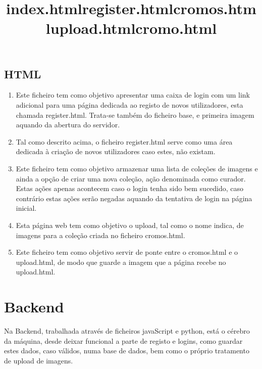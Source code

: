 \documentclass{report}
\begin{document}
\section{HTML}
\renewcommand{\theenumi}{\arabic{enumi}} 
\begin{enumerate} 

\item\title{\textbf{index.html}} 

Este ficheiro tem como objetivo apresentar uma caixa de login com  um link adicional para uma página dedicada ao registo de novos utilizadores, esta chamada register.html. Trata-se também do ficheiro base, e primeira imagem aquando da abertura do servidor.

\item\title{\textbf{register.html}} 

Tal como descrito acima, o ficheiro register.html serve como uma área dedicada à criação de novos utilizadores caso estes, não existam.

\item\title{\textbf{cromos.html}} 

Este ficheiro tem como objetivo armazenar uma lista de coleções de imagens e ainda a opção de criar uma nova coleção, ação denominada como curador. Estas ações apenas acontecem caso o login tenha sido bem sucedido, caso contrário estas ações serão negadas aquando da tentativa de login na página inicial.

\pagebreak

\item\title{\textbf{upload.html}} 

Esta página web tem como objetivo o upload, tal como o nome indica, de imagens para a coleção criada no ficheiro cromos.html.

\item\title{\textbf{cromo.html}} 

Este ficheiro tem como objetivo servir de ponte entre o cromos.html e o upload.html, de modo que guarde a imagem que a página recebe no upload.html.

\end{enumerate}
\pagebreak

\chapter{Backend}
\label{chapter3}

Na Backend, trabalhada através de ficheiros javaScript e python, está o cérebro da máquina, desde deixar funcional a parte de registo e logins, como guardar estes dados, caso válidos, numa base de dados, bem como o próprio tratamento de upload de imagens.
\end{document}
